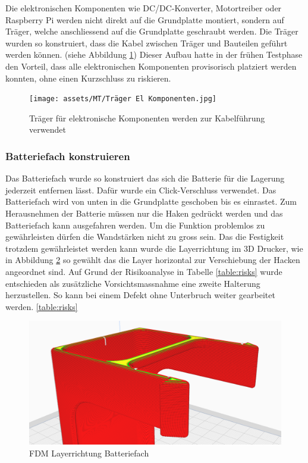 Die elektronischen Komponenten wie DC/DC-Konverter, Motortreiber oder Raspberry Pi werden nicht direkt auf die Grundplatte montiert, sondern auf Träger, welche anschliessend auf die Grundplatte geschraubt werden. Die Träger wurden so konstruiert, dass die Kabel zwischen Träger und Bauteilen geführt werden können. (siehe Abbildung \ref{fig: Träger für elektronische Komponenten}) Dieser Aufbau hatte in der frühen Testphase den Vorteil, dass alle elektronischen Komponenten provisorisch platziert werden konnten, ohne einen Kurzschluss zu riskieren. 

\begin{figure}[H]
\centering
\texttt{[image: assets/MT/Träger El Komponenten.jpg]}
\caption{Träger für elektronische Komponenten werden zur Kabelführung verwendet}
\label{fig: Träger für elektronische Komponenten}
\end{figure}

\subsubsection{Batteriefach konstruieren}
\label{Batteriefach konstruieren}

Das Batteriefach wurde so konstruiert das sich die Batterie für die Lagerung jederzeit entfernen lässt. Dafür wurde ein Click-Verschluss verwendet. Das Batteriefach wird von unten in die Grundplatte geschoben bis es einrastet. Zum Herausnehmen der Batterie müssen nur die Haken gedrückt werden und das Batteriefach kann ausgefahren werden. Um die Funktion problemlos zu gewährleisten dürfen die Wandstärken nicht zu gross sein. Das die Festigkeit trotzdem gewährleistet werden kann wurde die Layerrichtung im 3D Drucker, wie in Abbildung \ref{Layerrichtung Batteriefach} so gewählt das die Layer horizontal zur Verschiebung der Hacken angeordnet sind. Auf Grund der Risikoanalyse in Tabelle \ref{table:risks} wurde entschieden als zusätzliche Vorsichtsmassnahme eine zweite Halterung herzustellen. So kann bei einem Defekt ohne Unterbruch weiter gearbeitet werden. \ref{table:risks}


\begin{figure}[H]
\centering
\includegraphics[width=\textwidth]{assets/MT/Layer_Batterie Fach.png}
\caption{FDM Layerrichtung Batteriefach}
\label{Layerrichtung Batteriefach}
\end{figure}

